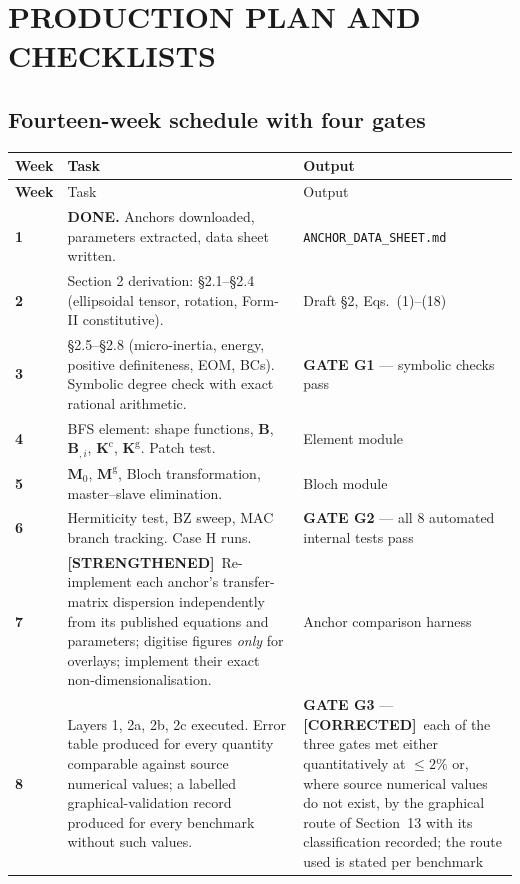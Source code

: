 \documentclass[11pt,a4paper]{article}
\newcommand{\STR}{{\color{strcol}\textbf{[STRENGTHENED]}}}
\newcommand{\COR}{{\color{corcol}\textbf{[CORRECTED]}}}
\begin{document}
\newpage
\section{PRODUCTION PLAN AND CHECKLISTS}

\subsection{Fourteen-week schedule with four gates}

\begin{longtable}{@{}>{\bfseries}p{1.5cm} L{8.2cm} L{4.6cm}@{}}
\toprule
Week & Task & Output \\
\midrule
\endfirsthead
\toprule
Week & Task & Output \\
\midrule
{} & \textbf{DONE.} Anchors downloaded, parameters extracted, data sheet written. & \texttt{ANCHOR\_DATA\_SHEET.md} \\
2 & Section 2 derivation: \S2.1--\S2.4 (ellipsoidal tensor, rotation, Form-II constitutive). & Draft \S2, Eqs.\ (1)--(18) \\
3 & \S2.5--\S2.8 (micro-inertia, energy, positive definiteness, EOM, BCs). Symbolic degree check with exact rational arithmetic. & \textbf{GATE G1} --- symbolic checks pass \\
4 & BFS element: shape functions, $\bm B$, $\bm B_{,i}$, $\bm K^{\mathrm c}$, $\bm K^{\mathrm g}$. Patch test. & Element module \\
5 & $\bm M_0$, $\bm M^{\mathrm g}$, Bloch transformation, master--slave elimination. & Bloch module \\
6 & Hermiticity test, BZ sweep, MAC branch tracking. Case H runs. & \textbf{GATE G2} --- all 8 automated internal tests pass \\
7 & \STR\ Re-implement each anchor's transfer-matrix dispersion independently from its published equations and parameters; digitise figures \emph{only} for overlays; implement their exact non-dimensionalisation. & Anchor comparison harness \\
8 & Layers 1, 2a, 2b, 2c executed. Error table produced for every quantity comparable against source numerical values; a labelled graphical-validation record produced for every benchmark without such values. & \textbf{GATE G3} --- \COR\ each of the three gates met either quantitatively at $\le2\%$ or, where source numerical values do not exist, by the graphical route of Section~13 with its classification recorded; the route used is stated per benchmark \\

\end{longtable}
\end{document}
